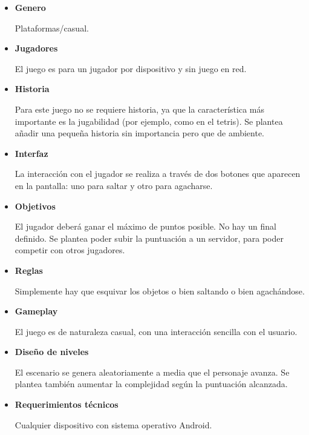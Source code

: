 \documentclass[12 pt, a4paper, twoside]{article}
\begin{document}
\begin{itemize}

  \item {\bf Genero}

    Plataformas/casual.

  \item {\bf Jugadores}

    El juego es para un jugador por dispositivo y sin juego en red.

  \item {\bf Historia}

    Para este juego no se requiere historia, ya que la característica más
    importante es la jugabilidad (por ejemplo, como en el tetris). Se plantea
    añadir una pequeña historia sin importancia pero que de ambiente.


  \item {\bf Interfaz}

    La interacción con el jugador se realiza a través de dos botones que
    aparecen en la pantalla: uno para saltar y otro para agacharse.

  \item {\bf Objetivos}

    El jugador deberá ganar el máximo de puntos posible. No hay un final
    definido. Se plantea poder subir la puntuación a un servidor, para poder
    competir con otros jugadores.

  \item {\bf Reglas}

    Simplemente hay que esquivar los objetos o bien saltando o bien
    agachándose.


  \item {\bf Gameplay}

    El juego es de naturaleza casual, con una interacción sencilla con el
    usuario.

  \item {\bf Diseño de niveles}

    El escenario se genera aleatoriamente a media que el personaje avanza. Se
    plantea también aumentar la complejidad según la puntuación alcanzada.

  \item {\bf Requerimientos técnicos}

    Cualquier dispositivo con sistema operativo Android.

\end{itemize}
\end{document}
